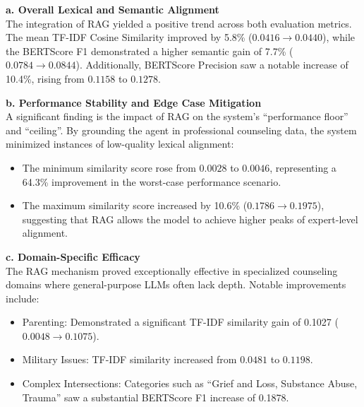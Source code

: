 \documentclass[journal,twoside,web]{ieeecolor}
\begin{document}
\textbf{a. Overall Lexical and Semantic Alignment} \\
The integration of RAG yielded a positive trend across both evaluation metrics. The mean TF-IDF Cosine Similarity improved by 5.8\% ($0.0416 \rightarrow 0.0440$), while the BERTScore F1 demonstrated a higher semantic gain of 7.7\% ($0.0784 \rightarrow 0.0844$). Additionally, BERTScore Precision saw a notable increase of 10.4\%, rising from $0.1158$ to $0.1278$.

\textbf{b. Performance Stability and Edge Case Mitigation} \\
A significant finding is the impact of RAG on the system's ``performance floor'' and ``ceiling''. By grounding the agent in professional counseling data, the system minimized instances of low-quality lexical alignment:
\begin{itemize}
    \item The minimum similarity score rose from $0.0028$ to $0.0046$, representing a 64.3\% improvement in the worst-case performance scenario.
    \item The maximum similarity score increased by 10.6\% ($0.1786 \rightarrow 0.1975$), suggesting that RAG allows the model to achieve higher peaks of expert-level alignment.
\end{itemize}

\textbf{c. Domain-Specific Efficacy} \\
The RAG mechanism proved exceptionally effective in specialized counseling domains where general-purpose LLMs often lack depth. Notable improvements include:
\begin{itemize}
    \item Parenting: Demonstrated a significant TF-IDF similarity gain of 0.1027 ($0.0048 \rightarrow 0.1075$).
    \item Military Issues: TF-IDF similarity increased from $0.0481$ to $0.1198$.
    \item Complex Intersections: Categories such as ``Grief and Loss, Substance Abuse, Trauma'' saw a substantial BERTScore F1 increase of 0.1878.
\end{itemize}
\end{document}
